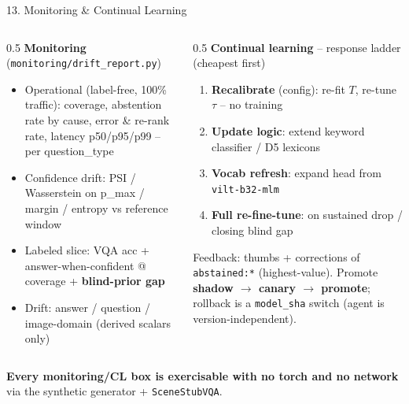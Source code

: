 \documentclass[10pt,aspectratio=169]{beamer}
\begin{document}
\begin{frame}{13. Monitoring \& Continual Learning}
\begin{columns}[T]
\begin{column}{0.5\textwidth}
\textbf{Monitoring} (\texttt{monitoring/drift\_report.py})
\begin{itemize}\scriptsize
  \item Operational (label-free, 100\% traffic): coverage, abstention rate by cause, error \& re-rank rate, latency p50/p95/p99 -- per question\_type
  \item Confidence drift: PSI / Wasserstein on p\_max / margin / entropy vs reference window
  \item Labeled slice: VQA acc + answer-when-confident @ coverage + \textbf{blind-prior gap}
  \item Drift: answer / question / image-domain (derived scalars only)
\end{itemize}
\end{column}
\begin{column}{0.5\textwidth}
\textbf{Continual learning} -- response ladder (cheapest first)
\begin{enumerate}\scriptsize
  \item \textbf{Recalibrate} (config): re-fit $T$, re-tune $\tau$ -- no training
  \item \textbf{Update logic}: extend keyword classifier / D5 lexicons
  \item \textbf{Vocab refresh}: expand head from \texttt{vilt-b32-mlm}
  \item \textbf{Full re-fine-tune}: on sustained drop / closing blind gap
\end{enumerate}
\scriptsize Feedback: thumbs + corrections of \texttt{abstained:*} (highest-value). Promote \textbf{shadow $\to$ canary $\to$ promote}; rollback is a \texttt{model\_sha} switch (agent is version-independent).
\end{column}
\end{columns}

\vspace{0.15cm}
\centering
\scriptsize \textbf{Every monitoring/CL box is exercisable with no torch and no network} via the synthetic generator + \texttt{SceneStubVQA}.
\end{frame}
\end{document}
